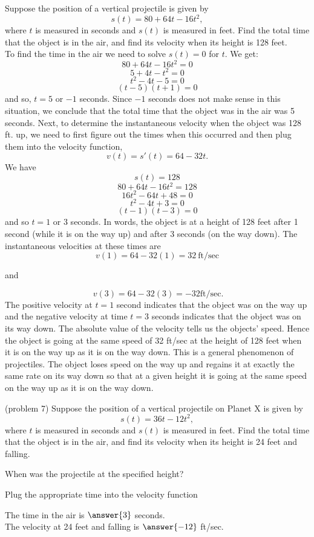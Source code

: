 \documentclass[handout]{ximera}
\begin{document}
\begin{example}[example 7]
Suppose the position of a vertical projectile is given by 
\[s(t) = 80 + 64t-16t^2, \]
where $t$ is measured in seconds and $s(t)$ is measured in feet. 
Find the total time that the object is in the air, and find its velocity when its height is 128 feet.\\
 
To find the time in the air we need to solve $s(t) = 0$ for $t$. We get:
\[80 + 64t-16t^2 = 0\]
\[5 + 4t-t^2 = 0\]
\[t^2 -4t -5  = 0\]
\[(t-5)(t+1)  = 0\]
and so, $t =  5$ or $-1$ seconds. Since $-1$ seconds does not make sense in this situation, we conclude that
the total time that the object was in the air was 5 seconds.
Next, to determine the instantaneous velocity when the object was 128 ft. up, 
we need to first figure out the times when this occurred and then plug them into the velocity function, 
\[v(t) = s'(t) = 64 - 32t.\]
We have
\[s(t) = 128 \]
\[80 + 64t -16t^2 = 128\]
\[  16t^2 - 64t + 48 = 0\]
\[  t^2 - 4t + 3 = 0\]
\[  (t-1)(t-3) = 0\]
and so $t= 1$ or $3$ seconds.
In words, the object is at a height of 128 feet after 1 second (while it is on the way up) and after 3 seconds (on the way down).
The instantaneous velocities at these times are
\[v(1) = 64 - 32(1) = 32 \ \text{ft/sec}\]
\begin{center}
  and
\end{center}
\[ \ v(3) = 64 - 32(3) = -32 \text{ft/sec.}\]
The positive velocity at $t= 1$ second indicates that the object was on the way up and the negative velocity 
at time $t=3$ seconds indicates 
that the object was on its way down.  The absolute value of the velocity tells us the objects' speed. 
Hence the object is going at the same speed of 32 ft/sec at the height of 128 feet when it is on the way up as it 
is on the way down.
This is a general phenomenon of projectiles. The object loses speed on the way up and 
regains it at exactly the same rate on its way down so that at a given height it is going at the same 
speed on the way up as it is on the way down.
\end{example}


\begin{problem}(problem 7)
Suppose the position of a vertical projectile on Planet X is given by 
\[s(t) = 36t - 12t^2, \]
where $t$ is measured in seconds and $s(t)$ is measured in feet. 
Find the total time that the object is in the air, and find its velocity when its height is 24 feet and falling.
\begin{hint}
When was the projectile at the specified height?
\end{hint}
\begin{hint}
Plug the appropriate time into the velocity function
\end{hint}

The time in the air is $\answer{3}$ seconds.\\
The velocity at 24 feet and falling is $\answer{-12}$ ft/sec.

\end{problem}


\end{document}
